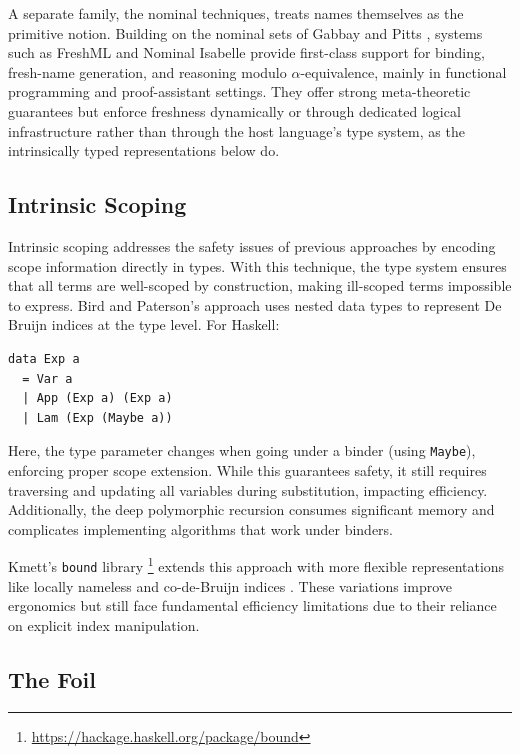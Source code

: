 A separate family, the nominal techniques, treats names themselves as the primitive notion. Building on the nominal sets of Gabbay and Pitts \cite{nominalSets2002}, systems such as FreshML \cite{freshML2003} and Nominal Isabelle \cite{nominalIsabelle2008} provide first-class support for binding, fresh-name generation, and reasoning modulo $\alpha$-equivalence, mainly in functional programming and proof-assistant settings. They offer strong meta-theoretic guarantees but enforce freshness dynamically or through dedicated logical infrastructure rather than through the host language's type system, as the intrinsically typed representations below do.

\subsection{Intrinsic Scoping}

Intrinsic scoping addresses the safety issues of previous approaches by encoding scope information directly in types. With this technique, the type system ensures that all terms are well-scoped by construction, making ill-scoped terms impossible to express. Bird and Paterson's approach \cite{BirdPaterson1999} uses nested data types to represent De Bruijn indices at the type level. For Haskell:

\begin{verbatim}
data Exp a
  = Var a
  | App (Exp a) (Exp a)
  | Lam (Exp (Maybe a))
\end{verbatim}

Here, the type parameter changes when going under a binder (using \texttt{Maybe}), enforcing proper scope extension. While this guarantees safety, it still requires traversing and updating all variables during substitution, impacting efficiency. Additionally, the deep polymorphic recursion consumes significant memory and complicates implementing algorithms that work under binders.

Kmett's \texttt{bound} library \footnote{\url{https://hackage.haskell.org/package/bound}} extends this approach with more flexible representations like locally nameless \cite{Chargueraud2012} and co-de-Bruijn indices \cite{McBride2018}. These variations improve ergonomics but still face fundamental efficiency limitations due to their reliance on explicit index manipulation.

\subsection{The Foil}

